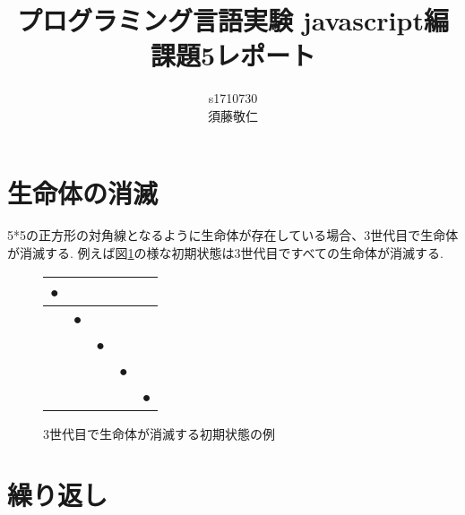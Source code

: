 \documentclass[a4J, 12pt]{jsarticle}
\title{プログラミング言語実験 javascript編\\課題5レポート}
\author{s1710730\\須藤敬仁}
\date{}
\begin{document}
\maketitle
\section{生命体の消滅}
5*5の正方形の対角線となるように生命体が存在している場合、3世代目で生命体が消滅する.
例えば図\ref{fig:life}の様な初期状態は3世代目ですべての生命体が消滅する.
\begin{figure}[tb] 
    \centering
    \begin{tabular}{|p{1em}|p{1em}|p{1em}|p{1em}|p{1em}|} \hline    
        ● & & & & \\ \hline
        & ● & & & \\ \hline
        & & ● & & \\ \hline
        & & & ● & \\ \hline
        & & & & ● \\ \hline
    \end{tabular}
    \caption{3世代目で生命体が消滅する初期状態の例}
    \label{fig:life}
\end{figure}
\section{繰り返し}
\end{document}
